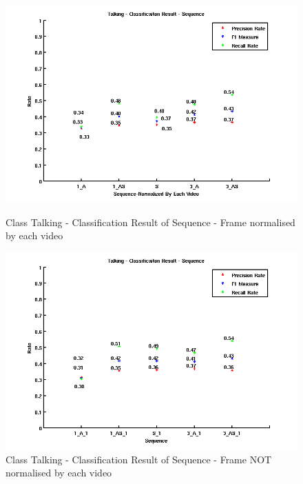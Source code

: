 \begin{figure}[ht]
\centering
\begin{minipage}{.5\textwidth}
  \centering
  \captionsetup{justification=centering,margin=1cm}
  \includegraphics[width=\linewidth]{imgs/Result_Talking_Sequence.png}
  \caption{Class Talking - Classification Result of Sequence - Frame normalised by each video}
  \label{fig:RTS}
\end{minipage}
\begin{minipage}{.5\textwidth}
  \centering
  \captionsetup{justification=centering,margin=1cm}
  \includegraphics[width=\linewidth]{imgs/Result_Talking_Sequence_1.png}
  \caption{Class Talking - Classification Result of Sequence - Frame NOT normalised by each video}
  \label{fig:RTS1}
\end{minipage}
\end{figure}
\newline

